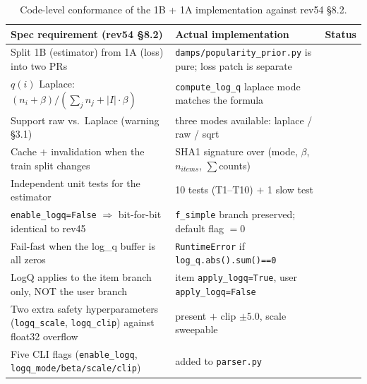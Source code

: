 \documentclass[11pt, a4paper]{article}
\newcommand{\cmark}{\textcolor{green!60!black}{\textbf{\checkmark}}}
\begin{document}
\renewcommand{\arraystretch}{1.35}
\begin{table}[h]
\centering
\caption{Code-level conformance of the 1B + 1A implementation against rev54 §8.2.}
\begin{tabularx}{\textwidth}{|Z|Z|c|}
\hline
{}
\textbf{Spec requirement (rev54 §8.2)} & \textbf{Actual implementation} & \textbf{Status} \\
\hline
Split 1B (estimator) from 1A (loss) into two PRs &
  \texttt{damps/popularity\_prior.py} is pure; loss patch is separate &
  \cmark \\
\hline
$q(i)$ Laplace: $(n_i+\beta)/(\sum_j n_j + |I|\cdot\beta)$ &
  \texttt{compute\_log\_q} laplace mode matches the formula &
  \cmark \\
\hline
Support raw vs.\ Laplace (warning §3.1) &
  three modes available: laplace / raw / sqrt &
  \cmark \\
\hline
Cache $+$ invalidation when the train split changes &
  SHA1 signature over (mode, $\beta$, $n_{items}$, $\sum$counts) &
  \cmark \\
\hline
Independent unit tests for the estimator &
  10 tests (T1--T10) $+$ 1 slow test &
  \cmark \\
\hline
\texttt{enable\_logq=False} $\Rightarrow$ bit-for-bit identical to rev45 &
  \texttt{f\_simple} branch preserved; default flag $=0$ &
  \cmark \\
\hline
Fail-fast when the log\_q buffer is all zeros &
  \texttt{RuntimeError} if \texttt{log\_q.abs().sum()==0} &
  \cmark \\
\hline
LogQ applies to the item branch only, NOT the user branch &
  item \texttt{apply\_logq=True}, user \texttt{apply\_logq=False} &
  \cmark \\
\hline
Two extra safety hyperparameters (\texttt{logq\_scale}, \texttt{logq\_clip}) against float32 overflow &
  present $+$ clip $\pm 5.0$, scale sweepable &
  \cmark \\
\hline
Five CLI flags (\texttt{enable\_logq}, \texttt{logq\_mode/beta/scale/clip}) &
  added to \texttt{parser.py} &
  \cmark \\
\hline
\end{tabularx}
\end{table}

\end{document}
